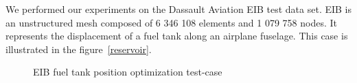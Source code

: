 \documentclass{IOS-Book-Article}
\begin{document}
We performed our experiments on the Dassault Aviation EIB test data set. EIB is an unstructured mesh composed of 6 346 108 elements and 1 079 758 nodes.
It represents the displacement of a fuel tank along an airplane fuselage. This case is illustrated in the figure~\ref{reservoir}.

\begin{figure}[htp]
 \centering
 \caption{EIB fuel tank position optimization test-case}
 \label{fig:asmCurves}
\end{figure}
\end{document}
